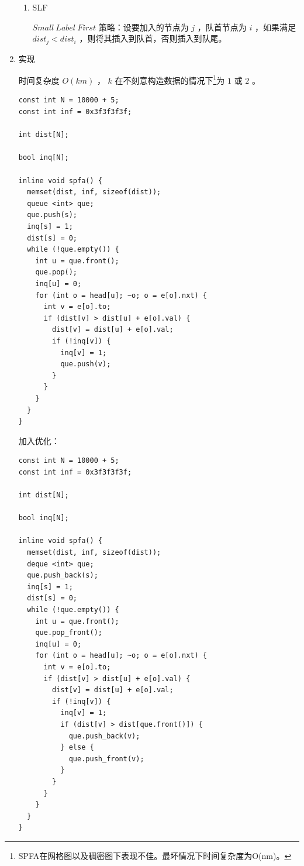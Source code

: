 \documentclass[11pt]{article}
\begin{document}
\begin{enumerate}
\begin{enumerate}
\item SLF
\label{sec-6-6-2-2-2}

$Small\ Label\ First$  策略：设要加入的节点为 $j$ ，队首节点为 $i$ ，如果满足 $dist_j < dist_i$ ，则将其插入到队首，否则插入到队尾。
\end{enumerate}

\item 实现
\label{sec-6-6-2-3}

时间复杂度 $O(km)$ ， $k$ 在不刻意构造数据的情况下\footnote{SPFA在网格图以及稠密图下表现不佳。最坏情况下时间复杂度为O(nm)。}为 $1$ 或 $2$ 。

\begin{verbatim}
const int N = 10000 + 5;
const int inf = 0x3f3f3f3f;

int dist[N];

bool inq[N];

inline void spfa() {
  memset(dist, inf, sizeof(dist));
  queue <int> que;
  que.push(s);
  inq[s] = 1;
  dist[s] = 0;
  while (!que.empty()) {
    int u = que.front();
    que.pop();
    inq[u] = 0;
    for (int o = head[u]; ~o; o = e[o].nxt) {
      int v = e[o].to;
      if (dist[v] > dist[u] + e[o].val) {
        dist[v] = dist[u] + e[o].val;
        if (!inq[v]) {
          inq[v] = 1;
          que.push(v);
        }
      }
    }
  }
}
\end{verbatim}

加入优化：

\begin{verbatim}
const int N = 10000 + 5;
const int inf = 0x3f3f3f3f;

int dist[N];

bool inq[N];

inline void spfa() {
  memset(dist, inf, sizeof(dist));
  deque <int> que;
  que.push_back(s);
  inq[s] = 1;
  dist[s] = 0;
  while (!que.empty()) {
    int u = que.front();
    que.pop_front();
    inq[u] = 0;
    for (int o = head[u]; ~o; o = e[o].nxt) {
      int v = e[o].to;
      if (dist[v] > dist[u] + e[o].val) {
        dist[v] = dist[u] + e[o].val;
        if (!inq[v]) {
          inq[v] = 1;
          if (dist[v] > dist[que.front()]) {
            que.push_back(v);
          } else {
            que.push_front(v);
          }
        }
      }
    }
  }
}
\end{verbatim}
\end{enumerate}
\end{document}
